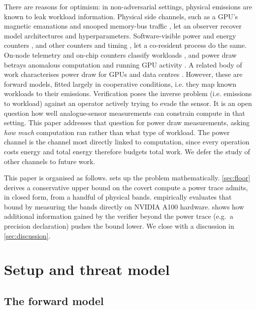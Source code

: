 \documentclass{article}
\theoremstyle{plain}
\theoremstyle{definition}
\theoremstyle{remark}
\begin{document}
There are reasons for optimism: in non-adversarial settings, physical
emissions are known to leak workload information. Physical side channels, such as a GPU's
magnetic emanations \citep{maia2022magnetic} and snooped memory-bus traffic
\citep{hu2020deepsniffer}, let an observer recover model architectures and
hyperparameters. Software-visible power and energy counters
\citep{gao2023deeptheft,chaudhuri2025energon}, and other counters and timing
\citep{naghibijouybari2018rendered,wei2020leaky}, let a co-resident process
do the same. On-node telemetry
and on-chip counters classify workloads
\citep{tang2022supercloud,xu2026wave,gangwal2019cryptomining}, and power
draw betrays anomalous computation \citep{clark2013wattsupdoc} and running
GPU activity \citep{arefin2024hdmi}. A related body of work characterises
power draw for GPUs and data centres
\citep{patel2023polca,choukse2025power,latif2025power}. However, these are forward models, fitted largely in cooperative conditions, i.e. they map known
workloads to their emissions. Verification poses the inverse
problem (i.e. emissions to workload) against an operator actively trying to
evade the sensor. It is an open question how well analogue-sensor
measurements can constrain compute in that setting. This paper addresses that
question for power draw measurements, asking \emph{how much} computation ran
rather than what type of workload. The power channel is the channel most directly linked to
computation, since every operation costs energy and total energy therefore
budgets total work. We defer the study of other channels to future work.

This paper is organised as follows.  sets up the problem mathematically.
\cref{sec:floor} derives a conservative upper bound on the covert compute a
power trace admits, in closed form, from a handful of physical bands.
 empirically evaluates that bound by measuring the
bands directly on NVIDIA A100 hardware.
 shows how additional information gained by the
verifier beyond the power trace (e.g.\ a precision declaration) pushes the bound lower. We close with a discussion in
\cref{sec:discussion}.

\section{Setup and threat model}
\label{sec:setup}

\subsection{The forward model}
\label{subsec:forward}
\end{document}
